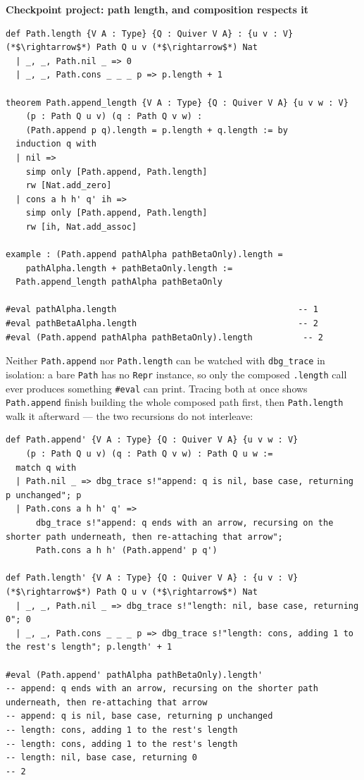 \textbf{Checkpoint project: path length, and composition respects it}

\begin{lstlisting}
def Path.length {V A : Type} {Q : Quiver V A} : {u v : V} (*$\rightarrow$*) Path Q u v (*$\rightarrow$*) Nat
  | _, _, Path.nil _ => 0
  | _, _, Path.cons _ _ _ p => p.length + 1

theorem Path.append_length {V A : Type} {Q : Quiver V A} {u v w : V}
    (p : Path Q u v) (q : Path Q v w) :
    (Path.append p q).length = p.length + q.length := by
  induction q with
  | nil =>
    simp only [Path.append, Path.length]
    rw [Nat.add_zero]
  | cons a h h' q' ih =>
    simp only [Path.append, Path.length]
    rw [ih, Nat.add_assoc]

example : (Path.append pathAlpha pathBetaOnly).length =
    pathAlpha.length + pathBetaOnly.length :=
  Path.append_length pathAlpha pathBetaOnly

#eval pathAlpha.length                                    -- 1
#eval pathBetaAlpha.length                                -- 2
#eval (Path.append pathAlpha pathBetaOnly).length          -- 2
\end{lstlisting}

Neither \texttt{Path.append} nor \texttt{Path.length} can be watched with \texttt{dbg\_\allowbreak{}trace} in isolation: a bare \texttt{Path} has no \texttt{Repr} instance, so only the composed \texttt{.length} call ever produces something \texttt{\#eval} can print. Tracing both at once shows \texttt{Path.append} finish building the whole composed path first, then \texttt{Path.length} walk it afterward --- the two recursions do not interleave:

\begin{lstlisting}
def Path.append' {V A : Type} {Q : Quiver V A} {u v w : V}
    (p : Path Q u v) (q : Path Q v w) : Path Q u w :=
  match q with
  | Path.nil _ => dbg_trace s!"append: q is nil, base case, returning p unchanged"; p
  | Path.cons a h h' q' =>
      dbg_trace s!"append: q ends with an arrow, recursing on the shorter path underneath, then re-attaching that arrow";
      Path.cons a h h' (Path.append' p q')

def Path.length' {V A : Type} {Q : Quiver V A} : {u v : V} (*$\rightarrow$*) Path Q u v (*$\rightarrow$*) Nat
  | _, _, Path.nil _ => dbg_trace s!"length: nil, base case, returning 0"; 0
  | _, _, Path.cons _ _ _ p => dbg_trace s!"length: cons, adding 1 to the rest's length"; p.length' + 1

#eval (Path.append' pathAlpha pathBetaOnly).length'
-- append: q ends with an arrow, recursing on the shorter path underneath, then re-attaching that arrow
-- append: q is nil, base case, returning p unchanged
-- length: cons, adding 1 to the rest's length
-- length: cons, adding 1 to the rest's length
-- length: nil, base case, returning 0
-- 2
\end{lstlisting}

